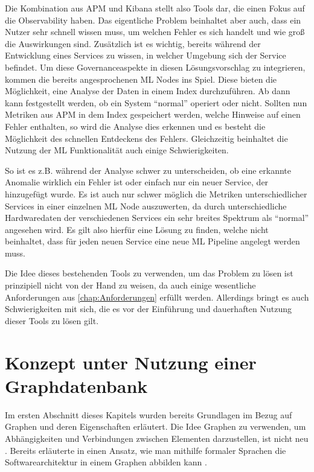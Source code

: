Die Kombination aus \ac{APM} und Kibana stellt also Tools dar, die einen Fokus auf die Observability haben. Das eigentliche Problem beinhaltet aber auch, dass ein Nutzer sehr schnell wissen muss, um welchen Fehler es sich handelt und wie groß die Auswirkungen sind. Zusätzlich ist es wichtig, bereits während der Entwicklung eines Services zu wissen, in welcher Umgebung sich der Service befindet. Um diese Governanceaspekte in diesen Lösungsvorschlag zu integrieren, kommen die bereits angesprochenen \ac{ML} Nodes ins Spiel. Diese bieten die Möglichkeit, eine Analyse der Daten in einem Index durchzuführen. Ab dann kann festgestellt werden, ob ein System \enquote{normal} operiert oder nicht. Sollten nun Metriken aus \ac{APM} in dem Index gespeichert werden, welche Hinweise auf einen Fehler enthalten, so wird die Analyse dies erkennen und es besteht die Möglichkeit des schnellen Entdeckens des Fehlers. Gleichzeitig beinhaltet die Nutzung der \ac{ML} Funktionalität auch einige Schwierigkeiten.

So ist es z.B. während der Analyse schwer zu unterscheiden, ob eine erkannte Anomalie wirklich ein Fehler ist oder einfach nur ein neuer Service, der hinzugefügt wurde. Es ist auch nur schwer möglich die Metriken unterschiedlicher Services in einer einzelnen \ac{ML} Node auszuwerten, da durch unterschiedliche Hardwaredaten der verschiedenen Services ein sehr breites Spektrum als \enquote{normal} angesehen wird. Es gilt also hierfür eine Lösung zu finden, welche nicht beinhaltet, dass für jeden neuen Service eine neue \ac{ML} Pipeline angelegt werden muss.

Die Idee dieses bestehenden Tools zu verwenden, um das Problem zu lösen ist prinzipiell nicht von der Hand zu weisen, da auch einige wesentliche Anforderungen aus \vref{chap:Anforderungen} erfüllt werden. Allerdings bringt es auch Schwierigkeiten mit sich, die es vor der Einführung und dauerhaften Nutzung dieser Tools zu lösen gilt.

\section{Konzept unter Nutzung einer Graphdatenbank}

Im ersten Abschnitt dieses Kapitels wurden bereits Grundlagen im Bezug auf Graphen und deren Eigenschaften erläutert. Die Idee Graphen zu verwenden, um Abhängigkeiten und Verbindungen zwischen Elementen darzustellen, ist nicht neu \autocite{Ren2018}. Bereits \citeyear{Metayer1998} erläuterte \citeauthor{Metayer1998} in \textit{} einen Ansatz, wie man mithilfe formaler Sprachen die Softwarearchitektur in einem Graphen abbilden kann \autocite{Metayer1998}.

